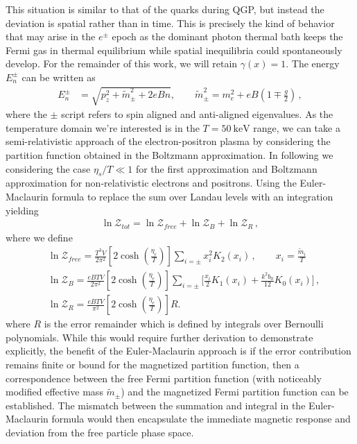 \documentclass[universe,article,submit,moreauthors,pdftex,a4paper]{Definitions/mdpi}
\begin{document}
This situation is similar to that of the quarks during QGP, but instead the deviation is spatial rather than in time. This is precisely the kind of behavior that may arise in the $e^{\pm}$ epoch as the dominant photon thermal bath keeps the Fermi gas in thermal equilibrium while spatial inequilibria could spontaneously develop. For the remainder of this work, we will retain $\gamma(x)=1$. The energy $E_{n}^\pm$ can be written as
\begin{align}
E_{n}^\pm&=\sqrt{p^2_z+\tilde m^2_\pm+2eBn},\qquad\tilde{m}^2_\pm=m^2_e+eB\left(1\mp\frac{g}{2}\right)\,,
\end{align}
where the $\pm$ script refers to spin aligned and anti-aligned eigenvalues. As the temperature domain we're interested is in the $T=50\ \mathrm{keV}$ range, we can take a semi-relativistic approach of the electron-positron plasma by considering the partition function obtained in the Boltzmann approximation. In following we considering the case $\eta_s/T\ll1$ for the first approximation and Boltzmann approximation for non-relativistic electrons and positrons. Using the Euler-Maclaurin formula to replace the sum over Landau levels with an integration yielding
\begin{align}
 \ln\mathcal{Z}_{tot}=\ln\mathcal{Z}_{free}+\ln\mathcal{Z}_B+\ln\mathcal{Z}_R\,,
\end{align}
where we define 
\begin{align}
 \label{FreePart}&\ln\mathcal{Z}_{free}=\frac{T^3V}{2\pi^2}\left[2\cosh{\left(\frac{\eta_{e}}{T}\right)}\right]\sum_{i=\pm}x_i^2K_2\left(x_i\right)\,,\qquad x_i=\frac{\tilde{m}_i}{T}\\
 \label{MagPart}&\ln\mathcal{Z}_B=\frac{eBTV}{2\pi^2}\left[2\cosh{\left(\frac{\eta_{e}}{T}\right)}\right]\sum_{i=\pm}\bigg[\frac{x_i}{2}K_1\left(x_i\right)+\frac{k^2b_0}{12}K_0\left(x_i\right)\bigg]\,,\\
 \label{ErrorPart}&\ln\mathcal{Z}_R=\frac{eBTV}{\pi^2}\left[2\cosh{\left(\frac{\eta_{e}}{T}\right)}\right]R.
\end{align}
where $R$ is the error remainder which is defined by integrals over Bernoulli polynomials.
While this would require further derivation to demonstrate explicitly, the benefit of the Euler-Maclaurin approach is if the error contribution remains finite or bound for the magnetized partition function, then a correspondence between the free Fermi partition function (with noticeably modified effective mass $\tilde{m}_{\pm}$) and the magnetized Fermi partition function can be established. The mismatch between the summation and integral in the Euler-Maclaurin formula would then encapsulate the immediate magnetic response and deviation from the free particle phase space.
\end{document}
